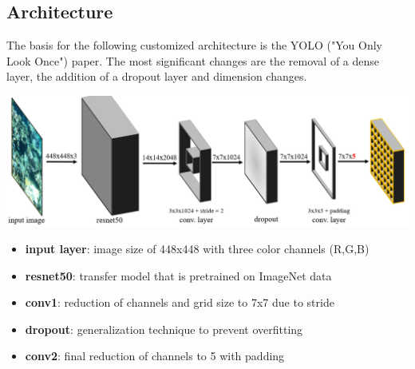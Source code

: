 \documentclass[landscape,a2,final,12pt]{issposter}
\begin{document}
\begin{samepage}
\begin{multicols}{3}
\section{Architecture}
    \begin{small}
        The basis for the following customized architecture is the YOLO ("You Only Look Once") paper.
        The most significant changes are the removal of a dense layer, the addition of a dropout layer and dimension changes.
    \end{small}

    \begin{center}
        \includegraphics[scale=0.7]{2_architecture.png}
    \end{center}
    \begin{small}
        \begin{itemize}
            \item {\textbf{input layer}: image size of 448x448 with three color channels (R,G,B)}
            \item {\textbf{resnet50}: transfer model that is pretrained on ImageNet data}
            \item {\textbf{conv1}: reduction of channels and grid size to 7x7 due to stride}
            \item {\textbf{dropout}: generalization technique to prevent overfitting}
            \item {\textbf{conv2}: final reduction of channels to 5 with padding}
        \end{itemize}
    \end{small}
    \columnbreak

\end{multicols}
\end{samepage}
\end{document}
